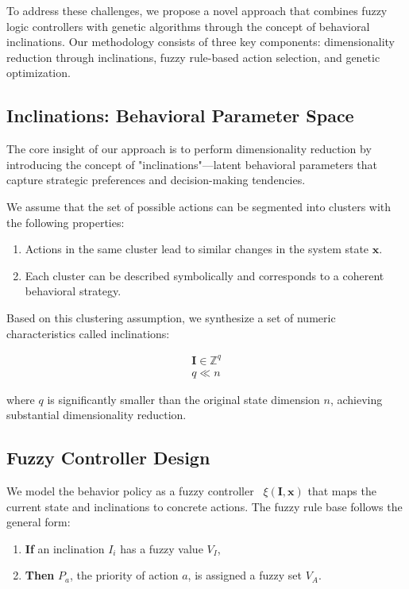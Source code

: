 \documentclass[11pt, a4paper]{article}
\begin{document}
To address these challenges, we propose a novel approach that combines fuzzy logic controllers with genetic algorithms through the concept of behavioral inclinations. Our methodology consists of three key components: dimensionality reduction through inclinations, fuzzy rule-based action selection, and genetic optimization.

\subsection{Inclinations: Behavioral Parameter Space}

The core insight of our approach is to perform dimensionality reduction by introducing the concept of "inclinations"—latent behavioral parameters that capture strategic preferences and decision-making tendencies.

We assume that the set of possible actions can be segmented into clusters with the following properties:

\begin{enumerate}
    \item Actions in the same cluster lead to similar changes in the system state $\mathbf{x}$.
    \item Each cluster can be described symbolically and corresponds to a coherent behavioral strategy.
\end{enumerate}

Based on this clustering assumption, we synthesize a set of numeric characteristics called inclinations:

\begin{eqnarray}
    \mathbf{I} \in \mathbb{Z}^q\\
    q \ll n \label{q<<n}
\end{eqnarray}

where $q$ is significantly smaller than the original state dimension $n$, achieving substantial dimensionality reduction.

\subsection{Fuzzy Controller Design}

We model the behavior policy as a fuzzy controller~\cite{ray2014softcomputing} $\xi(\mathbf{I}, \mathbf{x})$ that maps the current state and inclinations to concrete actions. The fuzzy rule base follows the general form:

\begin{enumerate}
    \item \textbf{If} an inclination $I_i$ has a fuzzy value $V_I$,
    \item \textbf{Then} $P_a$, the priority of action $a$, is assigned a fuzzy set $V_A$.
\end{enumerate}
\end{document}
